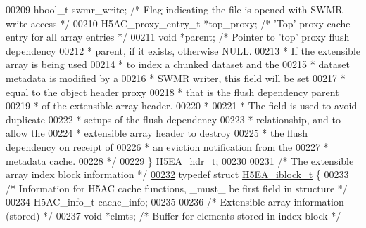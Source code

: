 \begin{DoxyCode}
00209     hbool\_t swmr\_write;                 \textcolor{comment}{/* Flag indicating the file is opened with SWMR-write access */}
00210     H5AC\_proxy\_entry\_t *top\_proxy;      \textcolor{comment}{/* 'Top' proxy cache entry for all array entries */}
00211     \textcolor{keywordtype}{void} *parent;               \textcolor{comment}{/* Pointer to 'top' proxy flush dependency}
00212 \textcolor{comment}{                                         * parent, if it exists, otherwise NULL.}
00213 \textcolor{comment}{                                         * If the extensible array is being used}
00214 \textcolor{comment}{                                         * to index a chunked dataset and the}
00215 \textcolor{comment}{                                         * dataset metadata is modified by a}
00216 \textcolor{comment}{                                         * SWMR writer, this field will be set}
00217 \textcolor{comment}{                                         * equal to the object header proxy}
00218 \textcolor{comment}{                                         * that is the flush dependency parent}
00219 \textcolor{comment}{                                         * of the extensible array header.}
00220 \textcolor{comment}{                     *}
00221 \textcolor{comment}{                     * The field is used to avoid duplicate}
00222 \textcolor{comment}{                     * setups of the flush dependency }
00223 \textcolor{comment}{                     * relationship, and to allow the }
00224 \textcolor{comment}{                     * extensible array header to destroy}
00225 \textcolor{comment}{                     * the flush dependency on receipt of }
00226 \textcolor{comment}{                     * an eviction notification from the}
00227 \textcolor{comment}{                     * metadata cache.}
00228 \textcolor{comment}{                     */}
00229 \} \hyperlink{struct_h5_e_a__hdr__t}{H5EA\_hdr\_t};
00230 
00231 \textcolor{comment}{/* The extensible array index block information */}
\hyperlink{struct_h5_e_a__iblock__t}{00232} \textcolor{keyword}{typedef} \textcolor{keyword}{struct }\hyperlink{struct_h5_e_a__iblock__t}{H5EA\_iblock\_t} \{
00233     \textcolor{comment}{/* Information for H5AC cache functions, \_must\_ be first field in structure */}
00234     H5AC\_info\_t cache\_info;
00235 
00236     \textcolor{comment}{/* Extensible array information (stored) */}
00237     \textcolor{keywordtype}{void}        *elmts;         \textcolor{comment}{/* Buffer for elements stored in index block  */}

\end{DoxyCode}

